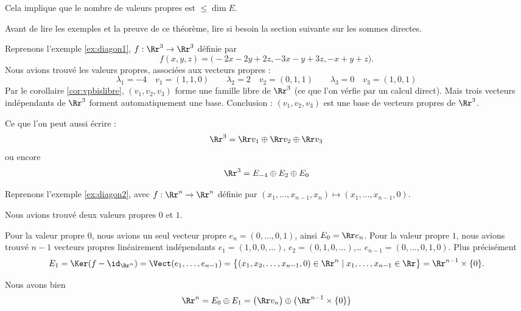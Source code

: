 \documentclass[12pt, class=report,crop=false]{standalone}
\begin{document}
Cela implique que le nombre de valeurs propres est $\le \dim E$.

Avant de lire les exemples et la preuve de ce théorème, lire si besoin la section suivante sur les sommes directes.

\begin{exemple}
Reprenons l'exemple \ref{ex:diagon1}, $f : \Rr^3 \to \Rr^3$ définie par 
$$f(x,y,z) = \big(
-2x-2y+ 2z, 
-3x-y+3z,
-x+y+z\big).$$
Nous avions trouvé les valeurs propres, associées aux vecteurs propres :
$$
\lambda_1 = -4
\quad
v_1 = (1,1,0)
\qquad
\lambda_2 = 2
\quad
v_2 = (0,1,1)
\qquad 
\lambda_3 = 0
\quad
v_3 = (1,0,1)$$
Par le corollaire \ref{cor:vpbislibre}, 
$(v_1,v_2,v_3)$ forme une famille libre de $\Rr^3$ (ce que l'on vérfie par un calcul direct).
Mais trois vecteurs indépendants de $\Rr^3$ forment automatiquement une base.
Conclusion : $(v_1,v_2,v_3)$ est une base de vecteurs propres de $\Rr^3$.

Ce que l'on peut aussi écrire :
$$\Rr^3 = \Rr v_1 \oplus \Rr v_2 \oplus \Rr v_3$$
ou encore 
$$\Rr^3 = E_{-4} \oplus E_2 \oplus E_0$$
\end{exemple}

\begin{exemple}
Reprenons l'exemple \ref{ex:diagon2}, avec $f : \Rr^n \to \Rr^n$ définie
par $(x_1,\ldots,x_{n-1},x_n) \mapsto (x_1,\ldots,x_{n-1},0)$.

Nous avions trouvé deux valeurs propres $0$ et $1$.

Pour la valeur propre $0$, nous avions un seul vecteur propre $e_n = (0,\ldots,0,1)$,
ainsi $E_0 = \Rr e_n$. Pour la valeur propre $1$, nous avions trouvé $n-1$ vecteurs propres linéairement indépendants $e_1 = (1,0,0,\ldots)$, $e_2 = (0,1,0,\ldots)$,\ldots 
$e_{n-1} = (0,\ldots,0,1,0)$. Plus  précisément
$$E_1 = \Ker (f-\id_{\Rr^n})  = \Vect(e_1,\ldots,e_{n-1}) = \big\{ (x_1,x_2,\ldots,x_{n-1},0) \in \Rr^n \mid x_1,\ldots,x_{n-1} \in \Rr \big\} = \Rr^{n-1} \times \{0\}.$$

Nous avons bien
$$\Rr^n = E_0 \oplus E_1 = \big(\Rr v_n\big) \oplus \big(\Rr^{n-1}\times \{0\}\big)$$
\end{exemple}


\bigskip
\end{document}
